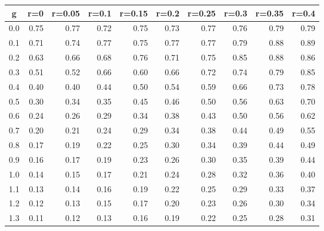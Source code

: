 %
\begin{table}[!tbp]
 \begin{center}
 \begin{tabular}{rrrrrrrrrr}\hline\hline
\multicolumn{1}{c}{g}&\multicolumn{1}{c}{r=0}&\multicolumn{1}{c}{r=0.05}&\multicolumn{1}{c}{r=0.1}&\multicolumn{1}{c}{r=0.15}&\multicolumn{1}{c}{r=0.2}&\multicolumn{1}{c}{r=0.25}&\multicolumn{1}{c}{r=0.3}&\multicolumn{1}{c}{r=0.35}&\multicolumn{1}{c}{r=0.4}\tabularnewline
\hline
0.0&0.75&0.77&0.72&0.75&0.73&0.77&0.76&0.79&0.79\tabularnewline
0.1&0.71&0.74&0.77&0.75&0.77&0.77&0.79&0.88&0.89\tabularnewline
0.2&0.63&0.66&0.68&0.76&0.71&0.75&0.85&0.88&0.86\tabularnewline
0.3&0.51&0.52&0.66&0.60&0.66&0.72&0.74&0.79&0.85\tabularnewline
0.4&0.40&0.40&0.44&0.50&0.54&0.59&0.66&0.73&0.78\tabularnewline
0.5&0.30&0.34&0.35&0.45&0.46&0.50&0.56&0.63&0.70\tabularnewline
0.6&0.24&0.26&0.29&0.34&0.38&0.43&0.50&0.56&0.62\tabularnewline
0.7&0.20&0.21&0.24&0.29&0.34&0.38&0.44&0.49&0.55\tabularnewline
0.8&0.17&0.19&0.22&0.25&0.30&0.34&0.39&0.44&0.49\tabularnewline
0.9&0.16&0.17&0.19&0.23&0.26&0.30&0.35&0.39&0.44\tabularnewline
1.0&0.14&0.15&0.17&0.21&0.24&0.28&0.32&0.36&0.40\tabularnewline
1.1&0.13&0.14&0.16&0.19&0.22&0.25&0.29&0.33&0.37\tabularnewline
1.2&0.12&0.13&0.15&0.17&0.20&0.23&0.26&0.30&0.34\tabularnewline
1.3&0.11&0.12&0.13&0.16&0.19&0.22&0.25&0.28&0.31\tabularnewline
\hline
\end{tabular}

\end{center}

\end{table}

